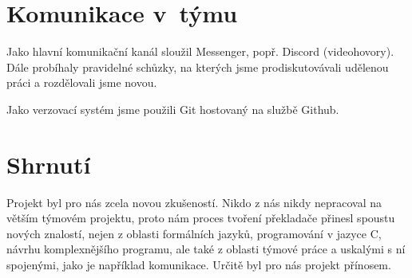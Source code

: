 \documentclass[11pt, a4paper]{article}
\begin{document}
\section{Komunikace v~týmu}
Jako hlavní komunikační kanál sloužil Messenger, popř. Discord (videohovory). Dále probíhaly pravidelné schůzky, na kterých jsme prodiskutovávali udělenou práci a rozdělovali jsme novou.  

Jako verzovací systém jsme použili Git hostovaný na službě Github. 

\section{Shrnutí}
Projekt byl pro nás zcela novou zkušeností. Nikdo z nás nikdy nepracoval na větším týmovém projektu, proto nám proces tvoření překladače přinesl spoustu nových znalostí, nejen z oblasti formálních jazyků, programování v jazyce C, návrhu komplexnějšího programu, ale také z oblasti týmové práce a uskalými s ní spojenými, jako je například komunikace. Určitě byl pro nás projekt přínosem. 





\newpage
\end{document}
